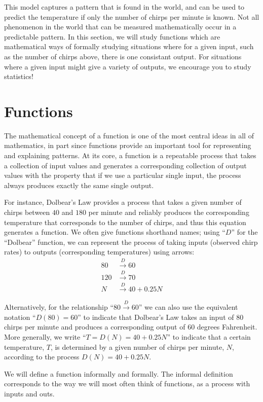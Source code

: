 \documentclass{ximera}
\begin{document}
This model captures a pattern that is found in the world, and can be used to predict the temperature if only the number of chirps per minute is known.  Not all phenomenon in the world that can be measured mathematically occur in a predictable pattern.  In this section, we will study functions which are mathematical ways of formally studying situations where for a given input, such as the number of chirps above, there is one consistant output.  For situations where a given input might give a variety of outputs, we encourage you to study statistics!

\section{Functions}
The mathematical concept of a function is one of the most central ideas in all of mathematics, in part since functions provide an important tool for representing and explaining patterns.  At its core, a function is a repeatable process that takes a collection of input values and generates a corresponding collection of output values with the property that if we use a particular single input, the process always produces exactly the same single output.

For instance, Dolbear's Law provides a process that takes a given number of chirps between $40$ and $180$ per minute and reliably produces the corresponding temperature that corresponds to the number of chirps, and thus this equation generates a function.  We often give functions shorthand names; using ``$D$'' for the ``Dolbear'' function, we can represent the process of taking inputs (observed chirp rates) to outputs (corresponding temperatures) using arrows:%
\begin{align*}
80 &\xrightarrow{D} 60\\
120 &\xrightarrow{D} 70\\
N &\xrightarrow{D} 40 + 0.25 N
\end{align*}

Alternatively, for the relationship ``$80 \xrightarrow{D} 60$'' we can also use the equivalent notation ``$D(80) = 60$'' to indicate that Dolbear's Law takes an input of $80$ chirps per minute and produces a corresponding output of $60$ degrees Fahrenheit.  More generally, we write ``$T = D(N) = 40 + 0.25N$'' to indicate that a certain temperature, $T$, is determined by a given number of chirps per minute, $N$, according to the process $D(N) = 40 + 0.25N$.


We will define a function informally and formally.  The informal definition corresponds to the way we will most often think of functions, as a process with inputs and outs.  
\end{document}
